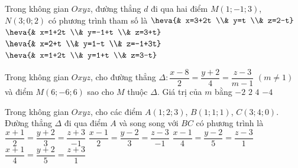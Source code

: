 \begin{ex}%
	Trong không  gian $Oxyz$, đường thẳng $d$ đi qua hai điểm $M(1;-1;3)$, $N(3;0;2)$ có phương trình tham số là
	\choice 
		 {\True $\heva{&
		x=3+2t \\& 
		 y=t \\&
		 z=2-t}$}
		{$\heva{& 
		x=1+2t  \\&
		y=-1+t \\& 
		z=3+t}$} 
		 {$\heva{&
		x=2+t \\& 
		y=1-t \\& 
		z=-1+3t}$} 
		{$\heva{& 
		x=1+2t \\& 
		y=1+t \\& 
		 z=3-t}$}
\end{ex}

\begin{ex}%
	Trong không gian $Oxyz$, cho đường thẳng $\Delta\colon \dfrac{x-8}{2}=\dfrac{y+2}{4}=\dfrac{z-3}{m-1}$ $(m \neq 1)$ và điểm $M(6;-6;6)$ sao  cho $M$ thuộc $\Delta$. Giá trị của $m$ bằng
	 \choice
		 {\True $-2$}
		 {$2$}
		{$4$} 
		{$-4$} 
\end{ex}

\begin{ex}%
	Trong không gian $Oxyz$, cho các  điểm $A(1;2;3)$, $B(1;1;1)$, $C(3;4;0)$. Đường thẳng $\Delta$ đi qua điểm $A$ và song song với $BC$ có phương trình là
	\choice 
		 {$\dfrac{x+1}{2}=\dfrac{y+2}{3}=\dfrac{z+3}{-1}$}
		 {\True $\dfrac{x-1}{2}=\dfrac{y-2}{3}=\dfrac{z-3}{-1}$}
		 {$\dfrac{x-1}{4}=\dfrac{y-2}{5}=\dfrac{z-3}{1}$}
		{$\dfrac{x+1}{4}=\dfrac{y+2}{5}=\dfrac{z+3}{1}$} 
\end{ex}

